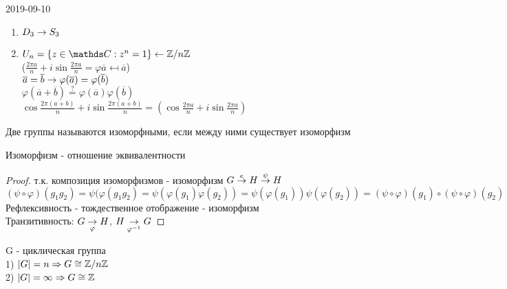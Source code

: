 \documentclass[main]{subfiles}
\begin{document}
\begin{lect} {2019-09-10}
	\begin{examples}
	    \begin{enumerate}
	        \item $D_3 \rightarrow S_3$
	        \item $U_n=\{z\in \CC: z^n=1\} \la \Z / n \Z$\\
	        ($\frac{2\pi a}{n}+i \sin \frac{2\pi a}{n} = \varphi \overline{a} \mapsfrom \overline{a}$)\\
	        $\overline{a}=\overline{b} \rightarrow \varphi(\overline{a})=\varphi(\overline{b})$\\
	        $\varphi(\overline{a}+\overline{b}) \overset{?}{=} \varphi(\overline{a})\varphi(\overline{b})$\\
	        $\cos \frac{2\pi(a+b)}{n}+i \sin \frac{2\pi(a+b)}{n}=(\cos\frac{2\pi a}{n} + i \sin \frac{2\pi a}{n}) $
	    \end{enumerate}
	\end{examples}

	\begin{definition}
	    Две группы называются изоморфными, если между ними существует изоморфизм
	\end{definition}

	\begin{utv}
	    Изоморфизм - отношение эквивалентности
	\end{utv}

	\begin{proof}
	    т.к. композиция изоморфизмов - изоморфизм $G \overset{e}{\rightarrow} H \overset{\psi}{\rightarrow} H$\\
	    $(\psi \circ \varphi)(g_1 g_2)= \psi(\varphi(g_1 g_2)=\psi(\varphi(g_1) \varphi(g_2))=\psi(\varphi(g_1)) \psi(\varphi(g_2)) = (\psi \circ \varphi)(g_1) \circ (\psi \circ \varphi)(g_2)$\\
	    Рефлексивность - тождественное отображение - изоморфизм\\
	    Транзитивность: $G \underset{\varphi}{\rightarrow} H$, $H \underset{\varphi^{-1}}{\rightarrow} G$
	\end{proof}

	\begin{theorem}
	    G - циклическая группа\\
	    1) $|G|=n \Rightarrow G \cong \mathbb{Z} / n \mathbb{Z}$\\
	    2) $|G|=\infty \Rightarrow G \cong \mathbb{Z}$
	\end{theorem}


\end{lect}
\end{document}
